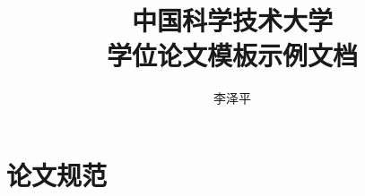 \documentclass[doctor]{ustcthesis}
\title{中国科学技术大学\\学位论文模板示例文档}
\author{李泽平}
\begin{document}
\maketitle

%

\frontmatter

\tableofcontents
% 

\mainmatter






\appendix
\chapter{论文规范}

\backmatter


\end{document}
